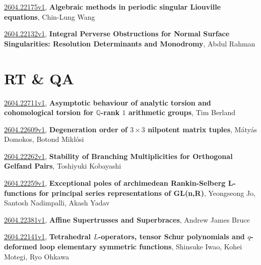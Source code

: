 \documentclass[9pt, a4paper]{article}
\theoremstyle{plain}
\theoremstyle{definition}
\theoremstyle{remark}
\newcommand{\arxiv}[3]{\href{https://arxiv.org/abs/#1}{#1}, \textbf{\textcolor{arxivblue}{#2}}, #3}
\begin{document}
\arxiv{2604.22175v1}{Algebraic methods in periodic singular Liouville equations}{Chin-Lung Wang}

\arxiv{2604.22132v1}{Integral Perverse Obstructions for Normal Surface Singularities: Resolution Determinants and Monodromy}{Abdul Rahman}


\section{RT \& QA}
\arxiv{2604.22711v1}{Asymptotic behaviour of analytic torsion and cohomological torsion for $\mathbb{Q}$-rank $1$ arithmetic groups}{Tim Berland}

\arxiv{2604.22609v1}{Degeneration order of $3\times 3$ nilpotent matrix tuples}{Mátyás Domokos, Botond Miklósi}

\arxiv{2604.22262v1}{Stability of Branching Multiplicities for Orthogonal Gelfand Pairs}{Toshiyuki Kobayashi}

\arxiv{2604.22259v1}{Exceptional poles of archimedean Rankin-Selberg L-functions for principal series representations of GL(n,R)}{Yeongseong Jo, Santosh Nadimpalli, Akash Yadav}

\arxiv{2604.22381v1}{Affine Supertrusses and Superbraces}{Andrew James Bruce}

\arxiv{2604.22141v1}{Tetrahedral $L$-operators, tensor Schur polynomials and $q$-deformed loop elementary symmetric functions}{Shinsuke Iwao, Kohei Motegi, Ryo Ohkawa}

\end{document}
